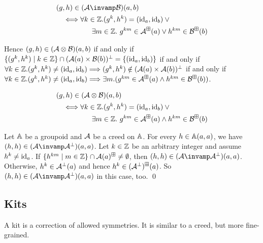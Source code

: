 \begin{align*}
    & (g,h) \in (\creed \llpar \creedb)(a,b)
    \\ &
    \quad\Longleftrightarrow
    \forall k \in \Int. (g^k, h^k) = (\ident_a, \ident_b) \vee {}
    \\ &
    \quad\qquad\qquad \exists m \in \Int.\ g^{km} \in \creed^{\boxplus}(a) \vee h^{km} \in \creedb^
    {\boxplus}(b)
\end{align*}

Hence \( (g, h) \in (\mathcal{A} \otimes \mathcal{B})(a,b) \) if and only if \( \{ (g^k, h^k) \mid k \in \mathbb{Z} \} \cap (\mathcal{A}(a) \times \mathcal{B}(b))^\bot = \{ (\mathrm{id}_a, \mathrm{id}_b) \} \) if and only if \( \forall k \in \mathbb{Z}. (g^k, h^k) \neq (\mathrm{id}_a, \mathrm{id}_b) \Longrightarrow (g^k, h^k) \notin (\mathcal{A}(a) \times \mathcal{A}(b))^\bot \) if and only if \( \forall k \in \mathbb{Z}. (g^k, h^k) \neq (\mathrm{id}_a, \mathrm{id}_b) \Longrightarrow \exists m. (g^{km} \in \mathcal{A}^\boxplus(a) \wedge h^{km} \in \mathcal{B}^\boxplus(b)) \).

\begin{align*}
    & (g,h) \in (\mathcal{A} \otimes \mathcal{B})(a,b)
    \\ &
    \quad\Longleftrightarrow
    \forall k \in \mathbb{Z}. (g^k, h^k) = (\mathrm{id}_a, \mathrm{id}_b) \vee {}
    \\ &
    \quad\qquad\qquad \exists m \in \mathbb{Z}.\ g^{km} \in \mathcal{A}^{\boxplus}(a) \wedge h^{km} \in \mathcal{B}^
    {\boxplus}(b)
\end{align*}

\begin{example}
    Let \( \mathbb{A} \) be a groupoid and \( \mathcal{A} \) be a creed on \( \mathbb{A} \).
    For every \( h \in \mathbb{A}(a,a) \), we have \( (h,h) \in (\creed \llpar \creed^{\bot})(a,a) \).
    Let \( k \in \mathbb{Z} \) be an arbitrary integer and assume \( h^k \neq \mathrm{id}_a \).
    If \( \{ h^{km} \mid m \in \mathbb{Z} \} \cap \mathcal{A}(a)^\boxplus \neq \emptyset \), then \( (h,h) \in (\creed \llpar \creed^{\bot})(a,a) \).
    Otherwise, \( h^{k} \in \mathcal{A}^\bot(a) \) and hence \( h^k \in (\mathcal{A}^\bot)^\boxplus(a) \).
    So \( (h,h) \in (\creed \llpar \creed^{\bot})(a,a) \) in this case, too.
    \qed
\end{example}


\subsection{Kits}
A kit is a correction of allowed symmetries.
It is similar to a creed, but more fine-grained.

